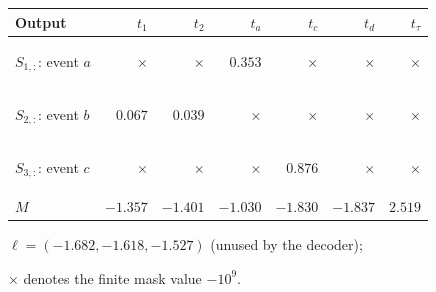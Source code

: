 \medskip
{\small
\begin{tabular}{@{}lrrrrrr@{}}
\toprule
Output & $t_1$ & $t_2$ & $t_a$ & $t_c$ & $t_d$ & $t_\tau$\\
\midrule
$S_{1,:}$: event $a$ & \begin{revised}$\times$\end{revised} & \begin{revised}$\times$\end{revised} & $0.353$ & \begin{revised}$\times$\end{revised} & \begin{revised}$\times$\end{revised} & \begin{revised}$\times$\end{revised}\\
$S_{2,:}$: event $b$ & $0.067$ & $0.039$ & \begin{revised}$\times$\end{revised} & \begin{revised}$\times$\end{revised} & \begin{revised}$\times$\end{revised} & \begin{revised}$\times$\end{revised}\\
$S_{3,:}$: event $c$ & \begin{revised}$\times$\end{revised} & \begin{revised}$\times$\end{revised} & \begin{revised}$\times$\end{revised} & $0.876$ & \begin{revised}$\times$\end{revised} & \begin{revised}$\times$\end{revised}\\
$M$ & $-1.357$ & $-1.401$ & $-1.030$ & $-1.830$ & $-1.837$ & $2.519$\\
\bottomrule
\end{tabular}
\par\smallskip
$\ell=(-1.682,-1.618,-1.527)$ (unused by the decoder);
\begin{revised}$\times$ denotes the finite mask value $-10^9$.\end{revised}
\par}
